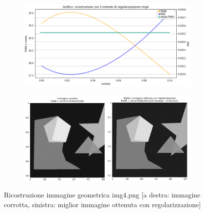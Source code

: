 \begin{figure}[H]
    \begin{subfigure}{0.5\textwidth}
        \includegraphics[width=\textwidth]{imgRicostruzione/grafico4minimize.png}
    \end{subfigure}%
    \begin{subfigure}{0.5\textwidth}
        \centering
        \includegraphics[width=\textwidth]{imgRicostruzione/ricostruzione4minimize.png}
    \end{subfigure}
    \caption{Ricostruzione immagine geometrica img4.png [a destra: immagine corrotta, sinistra: miglior immagine ottenuta con regolarizzazione]}
\end{figure}
